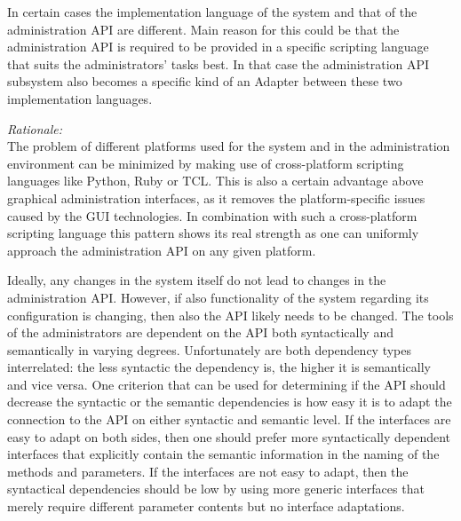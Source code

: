 In certain cases the implementation language of the system and that of the administration API are different. Main reason for this could be that the administration API is required to be provided in a specific scripting language that suits the administrators' tasks best. In that case the administration API subsystem also becomes a specific kind of an {\sc Adapter} \cite{Gamma95} between these two implementation languages.

\begin{center}
   
\end{center}

\textit{Rationale:}\\
The problem of different platforms used for the system and in the administration environment can be minimized by making use of cross-platform scripting languages like Python, Ruby or TCL. This is also a certain advantage above graphical administration interfaces, as it removes the platform-specific issues caused by the GUI technologies. In combination with such a cross-platform scripting language this pattern shows its real strength as one can uniformly approach the administration API on any given platform.

Ideally, any changes in the system itself do not lead to changes in the administration API. However, if also functionality of the system regarding its configuration is changing, then also the API likely needs to be changed. The tools of the administrators are dependent on the API both syntactically and semantically in varying degrees. Unfortunately are both dependency types interrelated: the less syntactic the dependency is, the higher it is semantically and vice versa. One criterion that can be used for determining if the API should decrease the syntactic or the semantic dependencies is how easy it is to adapt the connection to the API on either syntactic and semantic level. If the interfaces are easy to adapt on both sides, then one should prefer more syntactically dependent interfaces that explicitly contain the semantic information in the naming of the methods and parameters. If the interfaces are not easy to adapt, then the syntactical dependencies should be low by using more generic interfaces that merely require different parameter contents but no interface adaptations.  

